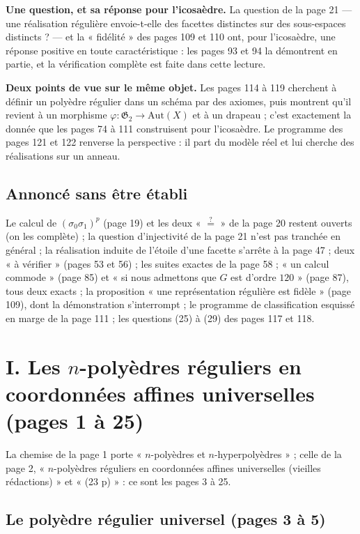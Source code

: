 \documentclass[11pt,a4paper]{article}
\begin{document}
\textbf{Une question, et sa réponse pour l'icosaèdre.} La question de la
page 21 --- une réalisation régulière envoie-t-elle des facettes distinctes sur
des sous-espaces distincts ? --- et la « fidélité » des pages 109 et 110 ont,
pour l'icosaèdre, une réponse positive en toute caractéristique : les pages
93 et 94 la démontrent en partie, et la vérification complète est faite dans
cette lecture.

\textbf{Deux points de vue sur le même objet.} Les pages 114 à 119 cherchent à
définir un polyèdre régulier dans un schéma par des axiomes, puis montrent
qu'il revient à un morphisme $\varphi : \mathfrak{G}_2 \to \mathrm{Aut}(X)$ et à un
drapeau ; c'est exactement la donnée que les pages 74 à 111 construisent pour
l'icosaèdre. Le programme des pages 121 et 122 renverse la perspective : il
part du modèle réel et lui cherche des réalisations sur un anneau.

\subsection*{Annoncé sans être établi}

Le calcul de $(\sigma_0\sigma_1)^p$ (page 19) et les deux « $\overset{?}{=}$ »
de la page 20 restent ouverts (on les complète) ; la question d'injectivité
de la page 21 n'est pas tranchée en général ; la réalisation induite de
l'étoile d'une facette s'arrête à la page 47 ; deux « à vérifier » (pages 53
et 56) ; les suites exactes de la page 58 ; « un calcul commode » (page 85) et
« si nous admettons que $G$ est d'ordre $120$ » (page 87), tous deux exacts ;
la proposition « une représentation régulière est fidèle » (page 109), dont la
démonstration s'interrompt ; le programme de classification esquissé en marge
de la page 111 ; les questions (25) à (29) des pages 117 et 118.

\section*{I. Les $n$-polyèdres réguliers en coordonnées affines universelles (pages 1 à 25)}

La chemise de la page 1 porte « $n$-polyèdres et $n$-hyperpolyèdres » ; celle de
la page 2, « $n$-polyèdres réguliers en coordonnées affines universelles
(vieilles rédactions) » et « (23 p) » : ce sont les pages 3 à 25.

\subsection*{Le polyèdre régulier universel (pages 3 à 5)}
\end{document}
